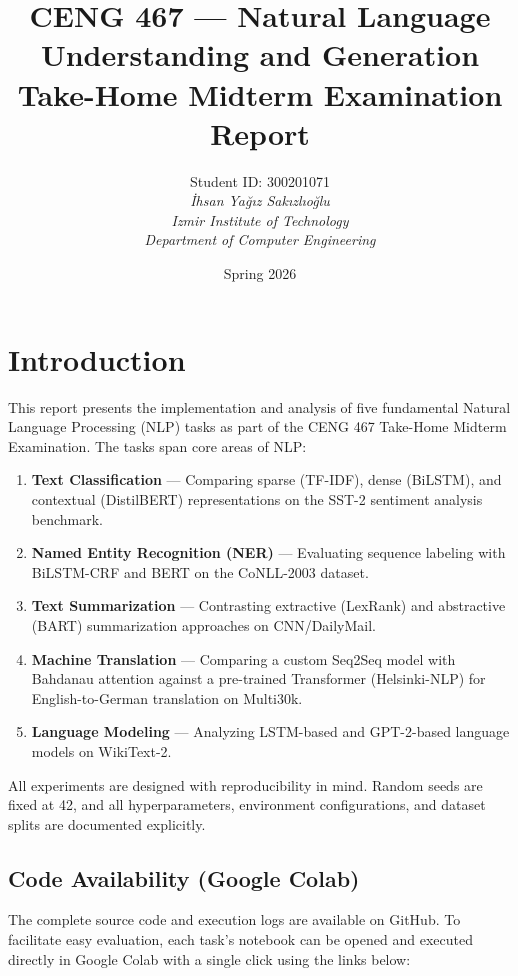 \documentclass[12pt, a4paper]{article}
\title{%
    \textbf{CENG 467 --- Natural Language Understanding and Generation}\\[0.5em]
    \Large Take-Home Midterm Examination Report
}
\author{%
    Student ID: 300201071\\
    \textit{İhsan Yağız Sakızlıoğlu}\\
    \textit{Izmir Institute of Technology}\\
    \textit{Department of Computer Engineering}
}
\date{Spring 2026}
\begin{document}
\maketitle
\tableofcontents
\newpage

\section{Introduction}

This report presents the implementation and analysis of five fundamental Natural Language Processing (NLP) tasks as part of the CENG 467 Take-Home Midterm Examination. The tasks span core areas of NLP:

\begin{enumerate}
    \item \textbf{Text Classification} --- Comparing sparse (TF-IDF), dense (BiLSTM), and contextual (DistilBERT) representations on the SST-2 sentiment analysis benchmark.
    \item \textbf{Named Entity Recognition (NER)} --- Evaluating sequence labeling with BiLSTM-CRF and BERT on the CoNLL-2003 dataset.
    \item \textbf{Text Summarization} --- Contrasting extractive (LexRank) and abstractive (BART) summarization approaches on CNN/DailyMail.
    \item \textbf{Machine Translation} --- Comparing a custom Seq2Seq model with Bahdanau attention against a pre-trained Transformer (Helsinki-NLP) for English-to-German translation on Multi30k.
    \item \textbf{Language Modeling} --- Analyzing LSTM-based and GPT-2-based language models on WikiText-2.
\end{enumerate}

All experiments are designed with reproducibility in mind. Random seeds are fixed at 42, and all hyperparameters, environment configurations, and dataset splits are documented explicitly.

\subsection{Code Availability (Google Colab)}

The complete source code and execution logs are available on GitHub. To facilitate easy evaluation, each task's notebook can be opened and executed directly in Google Colab with a single click using the links below:
\end{document}
